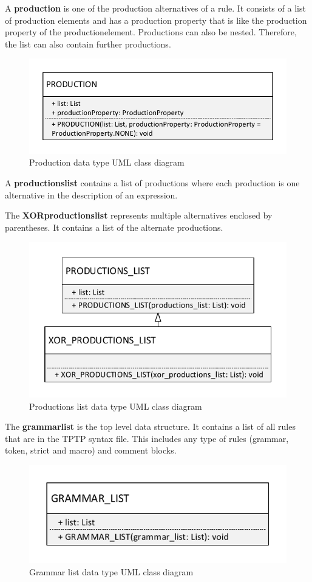 A \textbf{production} is one of the production alternatives of a rule.
It consists of a list of production elements and has a production property that is like the production property of the production\textunderscore element. Productions can also be nested.
Therefore, the list can also contain further productions. 

\begin{figure}[H]
\centering
\includegraphics[width=.5\textwidth]{images/Concept_uml_data_types_production.pdf}
\caption{Production data type UML class diagram}
\label{fig:ConceptProductionClassDiagram}
\end{figure}

A \textbf{productions\textunderscore list} contains a list of productions where each production is one alternative in the description of an expression. 

The \textbf{XOR\textunderscore productions\textunderscore list} represents multiple alternatives enclosed by parentheses. It contains a list of the alternate productions. 

\begin{figure}[H]
\centering
\includegraphics[width=.6\textwidth]{images/Concept_uml_data_types_productions_list.pdf}
\caption{Productions list data type UML class diagram}
\label{fig:ConceptProductionsListClassDiagram}
\end{figure}


The \textbf{grammar\textunderscore list} is the top level data structure. It contains a list of all rules that are in the TPTP syntax file.
This includes any type of rules (grammar, token, strict and macro) and comment blocks. 

\begin{figure}[H]
\centering
\includegraphics[width=.5\textwidth]{images/Concept_uml_data_types_grammar_list.pdf}
\caption{Grammar list data type UML class diagram}
\label{fig:ConceptGrammarListClassDiagram}
\end{figure}

